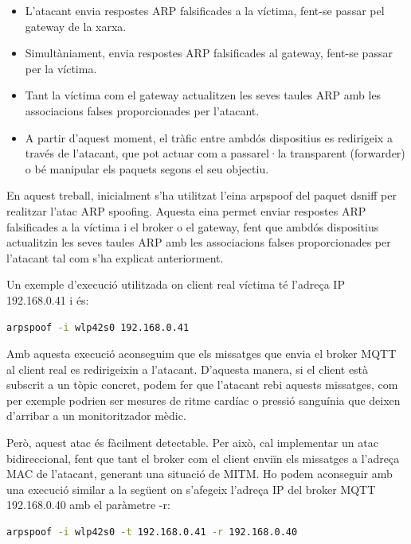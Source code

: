 \begin{itemize}
    \item L’atacant envia respostes ARP falsificades a la víctima, fent-se passar pel gateway de la xarxa.
    \item Simultàniament, envia respostes ARP falsificades al gateway, fent-se passar per la víctima.
    \item Tant la víctima com el gateway actualitzen les seves taules ARP amb les associacions falses proporcionades per l’atacant.
    \item A partir d’aquest moment, el tràfic entre ambdós dispositius es redirigeix a través de l’atacant, que pot actuar com a passarel·la transparent (forwarder) o bé manipular els paquets segons el seu objectiu.
\end{itemize}

En aquest treball, inicialment s'ha utilitzat l'eina arpspoof del paquet dsniff per realitzar l'atac ARP spoofing. Aquesta eina permet enviar respostes ARP falsificades a la víctima i el broker o el gateway, fent que ambdós dispositius actualitzin les seves taules ARP amb les associacions falses proporcionades per l'atacant tal com s'ha explicat anteriorment.

Un exemple d'execució utilitzada on client real víctima té l'adreça IP 192.168.0.41 i és:

\begin{lstlisting}[language=bash, caption={Execució Arpspoof}, label=lst:arpspoof]
    arpspoof -i wlp42s0 192.168.0.41
\end{lstlisting}

Amb aquesta execució aconseguim que els missatges que envia el broker MQTT al client real es redirigeixin a l'atacant. D'aquesta manera, si el client està subscrit a un tòpic concret, podem fer que l'atacant rebi aquests missatges, com per exemple podrien ser mesures de ritme cardíac o pressió sanguínia que deixen d'arribar a un monitoritzador mèdic. 

Però, aquest atac és fàcilment detectable. Per això, cal implementar un atac bidireccional, fent que tant el broker com el client enviïn els missatges a l'adreça MAC de l'atacant, generant una situació de MITM. Ho podem aconseguir amb una execució similar a la següent on s'afegeix l'adreça IP del broker MQTT 192.168.0.40 amb el paràmetre -r:

\begin{lstlisting}[language=bash, caption={Execució Arpspoof bidireccional}, label=lst:arpspoof_bidireccional]
    arpspoof -i wlp42s0 -t 192.168.0.41 -r 192.168.0.40
\end{lstlisting}

